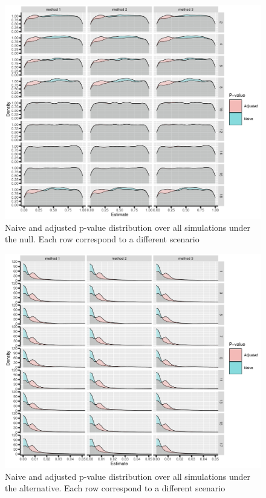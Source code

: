 \documentclass[12pt]{article}
\begin{document}
\begin{figure}[!h]
\centering
\includegraphics[trim={0 0 0 0},width=1\textwidth]{./figures/gg-pvalue-density.pdf}
\caption{Naive and adjusted p-value distribution over all simulations under the null. Each row correspond to a different scenario}
\end{figure}

\begin{figure}[!h]
\centering
\includegraphics[trim={0 0 0 0},width=1\textwidth]{./figures/gg-pvalue2-density.pdf}
\caption{Naive and adjusted p-value distribution over all simulations under the alternative. Each row correspond to a different scenario}
\end{figure}
\end{document}
